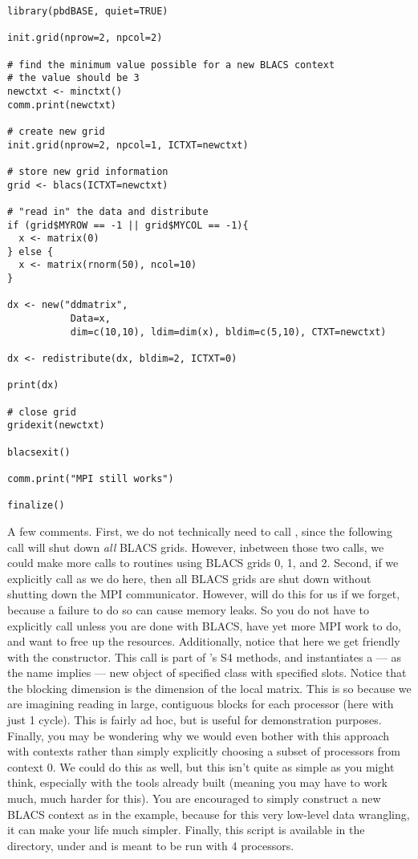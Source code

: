 \begin{lstlisting}[language=rr,title=Generating in Parallel]
library(pbdBASE, quiet=TRUE)

init.grid(nprow=2, npcol=2)

# find the minimum value possible for a new BLACS context
# the value should be 3
newctxt <- minctxt()
comm.print(newctxt)

# create new grid
init.grid(nprow=2, npcol=1, ICTXT=newctxt)

# store new grid information
grid <- blacs(ICTXT=newctxt)

# "read in" the data and distribute
if (grid$MYROW == -1 || grid$MYCOL == -1){
  x <- matrix(0)
} else {
  x <- matrix(rnorm(50), ncol=10)
}

dx <- new("ddmatrix", 
           Data=x, 
           dim=c(10,10), ldim=dim(x), bldim=c(5,10), CTXT=newctxt)

dx <- redistribute(dx, bldim=2, ICTXT=0)

print(dx)

# close grid
gridexit(newctxt)

blacsexit()

comm.print("MPI still works")

finalize()
\end{lstlisting}

A few comments.  First, we do not technically need to call , since the following  call will shut down \emph{all} BLACS grids.  However, inbetween those two calls, we could make more calls to routines using BLACS grids 0, 1, and 2.  Second, if we explicitly call  as we do here, then all BLACS grids are shut down without shutting down the MPI communicator.  However,  will do this for us if we forget, because a failure to do so can cause memory leaks.  So you do not have to explicitly call  unless you are done with BLACS, have yet more MPI work to do, and want to free up the resources.
\np
Additionally, notice that here we get friendly with the  constructor.  This call is part of 's S4 methods, and instantiates a --- as the name implies --- new object of specified class with specified slots.  Notice that the blocking dimension is the dimension of the local matrix.  This is so because we are imagining reading in large, contiguous blocks for each processor (here with just 1 cycle).  This is fairly ad hoc, but is useful for demonstration purposes. 
\np
Finally, you may be wondering why we would even bother with this approach with contexts rather than simply explicitly choosing a subset of processors from context 0.  We could do this as well, but this isn't quite as simple as you might think, especially with the tools already built (meaning you may have to work much, much harder for this).  You are encouraged to simply construct a new BLACS context as in the example, because for this very low-level data wrangling, it can make your life much simpler.
\np
Finally, this script is available in the  directory, under  and is meant to be run with 4 processors.